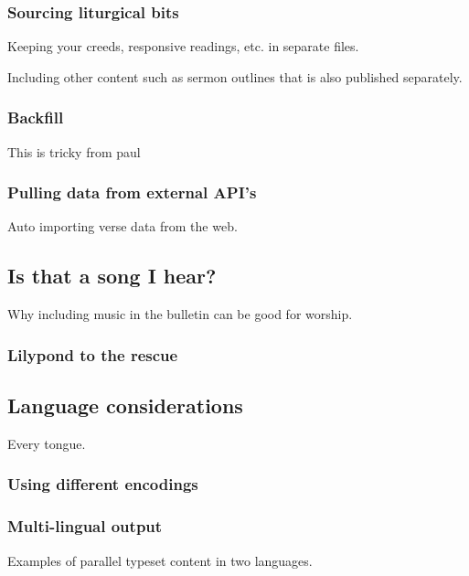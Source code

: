 \documentclass[12pt]{scrartcl}
\begin{document}
\subsubsection{Sourcing liturgical bits}

Keeping your creeds, responsive readings, etc. in separate files.

Including other content such as sermon outlines that is also published
separately.

\subsubsection{Backfill}


This is tricky from paul \cite{backfill}

\subsubsection{Pulling data from external API's}

Auto importing verse data from the web.

\subsection{Is that a song I hear?}

Why including music in the bulletin can be good for worship.

\subsubsection{Lilypond to the rescue}

\subsection{Language considerations}

Every tongue.

\subsubsection{Using different encodings}

\subsubsection{Multi-lingual output}

Examples of parallel typeset content in two languages.
\end{document}
